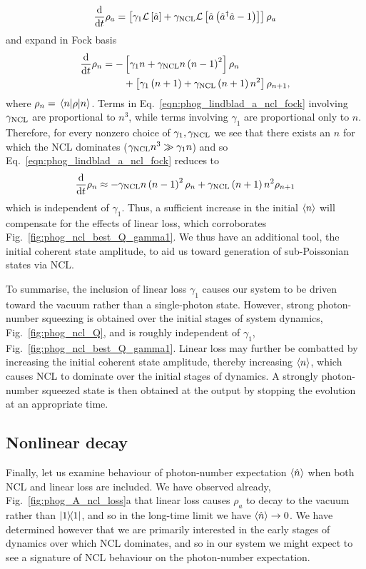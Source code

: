 \begin{equation}\label{eqn:phog_lindblad_a_ncl_2}
\frac{\mathrm{d}}{\mathrm{d}t} \rho_a = \left[ \gamma_1 \mathcal{L}\left[\hat{a}\right] + \gamma_{\text{NCL}} \mathcal{L}\left[\hat{a}\left(\hat{a}^\dagger \hat{a} - 1\right)\right]\right] \rho_a
\end{equation}
and expand in Fock basis
\begin{align}\label{eqn:phog_lindblad_a_ncl_fock}
\ddt \rho_{n} = - &\left[ \gamma_1 n + \gncl n \left(n - 1\right)^2 \right] \rho_n \notag \\
%
&+\left[ \gamma_1 \left(n+1\right) + \gncl \left(n+1\right) n^2 \right] \rho_{n+1},
\end{align}
where $\rho_n = \ev{\rho}{n}$. Terms in Eq.~\ref{eqn:phog_lindblad_a_ncl_fock} involving $\gamma_{\text{NCL}}$ are proportional to $n^3$, while terms involving $\gamma_1$ are proportional only to $n$. Therefore, for every nonzero choice of $\gamma_1, \gamma_{\text{NCL}}$ we see that there exists an $n$ for which the NCL dominates ($\gamma_{\text{NCL}} n^3 \gg \gamma_1 n$) and so Eq.~\ref{eqn:phog_lindblad_a_ncl_fock} reduces to
\begin{equation}
\frac{\mathrm{d}}{\mathrm{d}t} \rho_n \approx - \gamma_{\text{NCL}} n \left(n-1\right)^2 \rho_n + \gamma_{\text{NCL}} \left(n+1\right)n^2 \rho_{n+1}
\end{equation}
which is independent of $\gamma_1$. Thus, a sufficient increase in the initial $\ev{n}$ will compensate for the effects of linear loss, which corroborates Fig.~\ref{fig:phog_ncl_best_Q_gamma1}. We thus have an additional tool, the initial coherent state amplitude, to aid us toward generation of sub-Poissonian states via NCL.

To summarise, the inclusion of linear loss $\gamma_1$ causes our system to be driven toward the vacuum rather than a single-photon state. However, strong photon-number squeezing is obtained over the initial stages of system dynamics, Fig.~\ref{fig:phog_ncl_Q}, and is roughly independent of $\gamma_1$, Fig.~\ref{fig:phog_ncl_best_Q_gamma1}. Linear loss may further be combatted \cite{Mikhalychev2011, Mogilevtsev2013} by increasing the initial coherent state amplitude, thereby increasing $\ev{n}$, which causes NCL to dominate over the initial stages of dynamics. A strongly photon-number squeezed state is then obtained at the output by stopping the evolution at an appropriate time.


\subsection{Nonlinear decay}

Finally, let us examine behaviour of photon-number expectation $\ev{\hat{n}}$ when both NCL and linear loss are included. We have observed already, Fig.~\ref{fig:phog_A_ncl_loss}a that linear loss causes $\rho_a$ to decay to the vacuum rather than $\dyad{1}$, and so in the long-time limit we have $\ev{\hat{n}} \rightarrow 0$. We have determined however that we are primarily interested in the early stages of dynamics over which NCL dominates, and so in our system we might expect to see a signature of NCL behaviour on the photon-number expectation.

